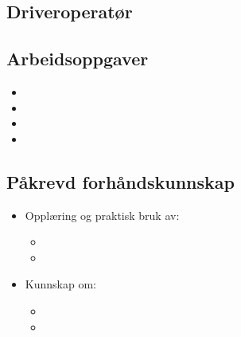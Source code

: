 \subsection{Driveroperatør}

\subsection*{Arbeidsoppgaver}
\begin{itemize}
\item{}
\item{}
\item{}
\item{}
\end{itemize}


\subsection*{Påkrevd forhåndskunnskap}
\begin{itemize}
\item{Opplæring og praktisk bruk av:}
\begin{itemize}
\item{}
\item{}
\end{itemize}
\item{Kunnskap om:}
\begin{itemize}
\item{}
\item{}
\end{itemize}
\end{itemize}